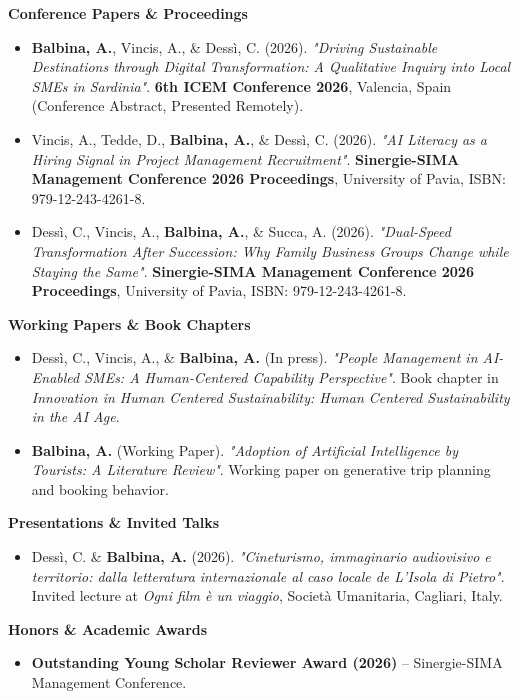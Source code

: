 \documentclass[10pt,a4paper]{article}
\begin{document}
\textbf{Conference Papers \& Proceedings}
\begin{itemize}
    \item \textbf{Balbina, A.}, Vincis, A., \& Dessì, C. (2026). \textit{"Driving Sustainable Destinations through Digital Transformation: A Qualitative Inquiry into Local SMEs in Sardinia"}. \textbf{6th ICEM Conference 2026}, Valencia, Spain (Conference Abstract, Presented Remotely).
    \item Vincis, A., Tedde, D., \textbf{Balbina, A.}, \& Dessì, C. (2026). \textit{"AI Literacy as a Hiring Signal in Project Management Recruitment"}. \textbf{Sinergie-SIMA Management Conference 2026 Proceedings}, University of Pavia, ISBN: 979-12-243-4261-8.
    \item Dessì, C., Vincis, A., \textbf{Balbina, A.}, \& Succa, A. (2026). \textit{"Dual-Speed Transformation After Succession: Why Family Business Groups Change while Staying the Same"}. \textbf{Sinergie-SIMA Management Conference 2026 Proceedings}, University of Pavia, ISBN: 979-12-243-4261-8.
\end{itemize}

\vspace{2pt}
\textbf{Working Papers \& Book Chapters}
\begin{itemize}
    \item Dessì, C., Vincis, A., \& \textbf{Balbina, A.} (In press). \textit{"People Management in AI-Enabled SMEs: A Human-Centered Capability Perspective"}. Book chapter in \textit{Innovation in Human Centered Sustainability: Human Centered Sustainability in the AI Age}.
    \item \textbf{Balbina, A.} (Working Paper). \textit{"Adoption of Artificial Intelligence by Tourists: A Literature Review"}. Working paper on generative trip planning and booking behavior.
\end{itemize}

\vspace{2pt}
\textbf{Presentations \& Invited Talks}
\begin{itemize}
    \item Dessì, C. \& \textbf{Balbina, A.} (2026). \textit{"Cineturismo, immaginario audiovisivo e territorio: dalla letteratura internazionale al caso locale de L'Isola di Pietro"}. Invited lecture at \textit{Ogni film è un viaggio}, Società Umanitaria, Cagliari, Italy.
\end{itemize}

\vspace{2pt}
\textbf{Honors \& Academic Awards}
\begin{itemize}
    \item \textbf{Outstanding Young Scholar Reviewer Award (2026)} -- Sinergie-SIMA Management Conference.
\end{itemize}
\end{document}
